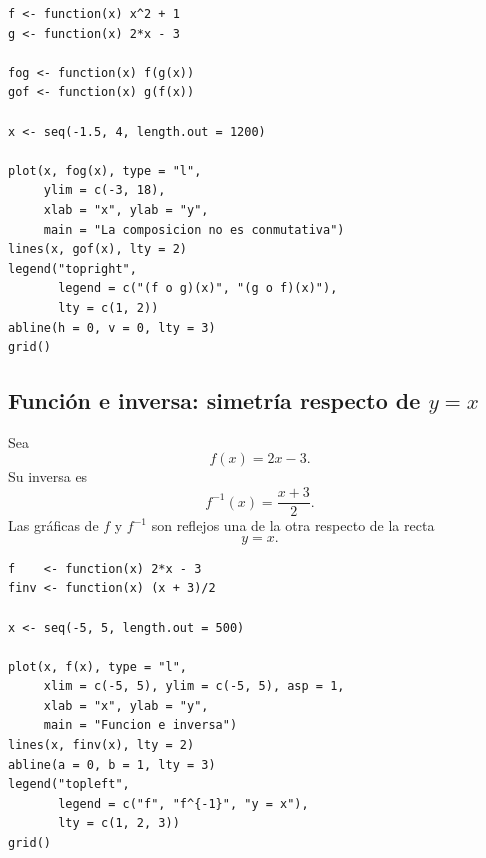\documentclass[12pt]{article}
\theoremstyle{remark}
\begin{document}
\begin{verbatim}
f <- function(x) x^2 + 1
g <- function(x) 2*x - 3

fog <- function(x) f(g(x))
gof <- function(x) g(f(x))

x <- seq(-1.5, 4, length.out = 1200)

plot(x, fog(x), type = "l",
     ylim = c(-3, 18),
     xlab = "x", ylab = "y",
     main = "La composicion no es conmutativa")
lines(x, gof(x), lty = 2)
legend("topright",
       legend = c("(f o g)(x)", "(g o f)(x)"),
       lty = c(1, 2))
abline(h = 0, v = 0, lty = 3)
grid()
\end{verbatim}

\subsection*{Función e inversa: simetría respecto de $y=x$}

Sea
\[
f(x)=2x-3.
\]
Su inversa es
\[
f^{-1}(x)=\frac{x+3}{2}.
\]
Las gráficas de $f$ y $f^{-1}$ son reflejos una de la otra respecto de la
recta
\[
y=x.
\]

\begin{center}
\end{center}

\begin{verbatim}
f    <- function(x) 2*x - 3
finv <- function(x) (x + 3)/2

x <- seq(-5, 5, length.out = 500)

plot(x, f(x), type = "l",
     xlim = c(-5, 5), ylim = c(-5, 5), asp = 1,
     xlab = "x", ylab = "y",
     main = "Funcion e inversa")
lines(x, finv(x), lty = 2)
abline(a = 0, b = 1, lty = 3)
legend("topleft",
       legend = c("f", "f^{-1}", "y = x"),
       lty = c(1, 2, 3))
grid()
\end{verbatim}

\end{document}
